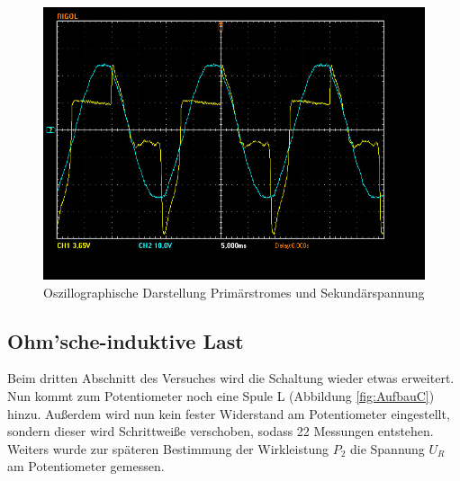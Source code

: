 \documentclass[12pt,a4paper,twoside]{article}
\begin{document}
\begin{figure}[H]
    \centering
    \includegraphics[width=0.6\linewidth, angle=0]{nudes/A2 Oszi.jpg}
    \caption{Oszillographische Darstellung Primärstromes und Sekundärspannung}
    \label{fig:OszilloskopB}
\end{figure}


\subsection{Ohm'sche-induktive Last}

Beim dritten Abschnitt des Versuches wird die Schaltung wieder etwas erweitert. Nun kommt zum Potentiometer noch eine Spule L (Abbildung \ref{fig:AufbauC}) hinzu.
Außerdem wird nun kein fester Widerstand am Potentiometer eingestellt, sondern dieser wird Schrittweiße verschoben, sodass 22 Messungen entstehen. Weiters wurde zur späteren Bestimmung der Wirkleistung $P_{2}$ die Spannung $U_{R}$ am Potentiometer gemessen.
\end{document}
